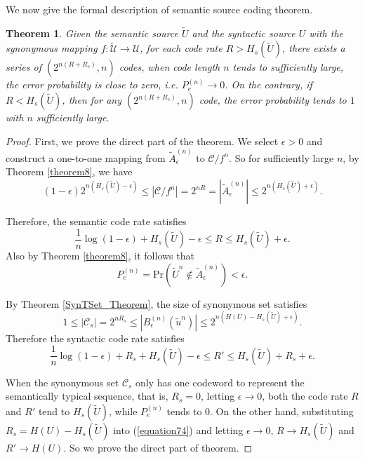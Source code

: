 \documentclass[12pt, draftclsnofoot,onecolumn]{IEEEtran}
\newtheorem{theorem}{\bf{Theorem}}
\begin{document}
We now give the formal description of semantic source coding theorem.
\begin{theorem}
Given the semantic source $\tilde{U}$ and the syntactic source $U$ with the synonymous mapping $f:\tilde{\mathcal{U}}\to \mathcal{U}$, for each code rate $R>H_s(\tilde{U})$, there exists a series of $\left(2^{n(R+R_s)},n\right)$ codes, when code length $n$ tends to sufficiently large, the error probability is close to zero, i.e. $P_e^{(n)}\to 0$. On the contrary, if $R<H_s(\tilde{U})$, then for any $\left(2^{n(R+R_s)},n\right)$ code, the error probability tends to $1$ with $n$ sufficiently large.
\end{theorem}
\begin{proof}
First, we prove the direct part of the theorem. We select $\epsilon>0$ and construct a one-to-one mapping from $\tilde{A}_{\epsilon}^{(n)}$ to $\mathcal{C}/f^n$. So for sufficiently large $n$, by Theorem \ref{theorem8}, we have
\begin{equation}
\left(1-\epsilon\right) 2^{n\left(H_s(\tilde{U})-\epsilon\right)}\leq\left|\mathcal{C}/f^n\right|=2^{nR}=\left|\tilde{A}_{\epsilon}^{(n)}\right| \leq 2^{n\left(H_s(\tilde{U})+\epsilon\right)}.
\end{equation}


Therefore, the semantic code rate satisfies
\begin{equation}
\frac{1}{n}\log\left(1-\epsilon\right)+H_s(\tilde{U})-\epsilon \leq R \leq H_s(\tilde{U})+\epsilon .
\end{equation}
Also by Theorem \ref{theorem8}, it follows that
\begin{equation}
P_e^{(n)}=\text{Pr}(\tilde{U}^n\notin \tilde{A}_{\epsilon}^{(n)})<\epsilon.
\end{equation}

By Theorem \ref{SynTSet_Theorem}, the size of synonymous set satisfies
\begin{equation}
1\leq\left|\mathcal{C}_s\right|=2^{nR_s}\leq \left|B_{\epsilon}^{(n)}\left(\tilde{u}^n\right)\right| \leq 2^{n\left(H(U)-H_s(\tilde{U})+\epsilon\right)}.
\end{equation}
Therefore the syntactic code rate satisfies
\begin{equation}\label{equation74}
\frac{1}{n}\log\left(1-\epsilon\right)+R_s+H_s(\tilde{U})-\epsilon \leq R' \leq H_s(\tilde{U})+R_s+\epsilon .
\end{equation}

When the synonymous set $\mathcal{C}_s$ only has one codeword to represent the semantically typical sequence, that is, $R_s=0$, letting $\epsilon\to 0$, both the code rate $R$ and $R'$ tend to $H_s(\tilde{U})$, while $P_e^{(n)}$ tends to $0$. On the other hand, substituting $R_s=H(U)-H_s(\tilde{U})$ into (\ref{equation74}) and letting $\epsilon\to 0$, $R\to H_s(\tilde{U})$ and $R'\to H(U)$. So we prove the direct part of theorem.


\end{proof}
\end{document}
